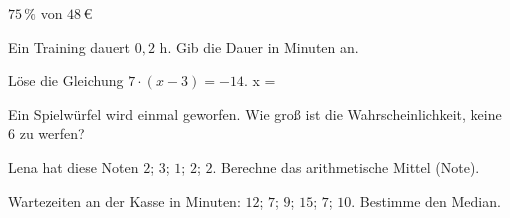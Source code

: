 \documentclass[11pt]{article}
\begin{document}
\noindent\begin{minipage}[t]{0.485\linewidth}\raggedright
\begin{aufgabe}{$75\,\%$ von $48\,€$ \leerfeld[€]}
\end{aufgabe}
\end{minipage}\hfill\begin{minipage}[t]{0.485\linewidth}\raggedright
\begin{aufgabe}{Ein Training dauert $0{,}2$ h. Gib die Dauer in Minuten an. \leerfeld[min]}
\end{aufgabe}
\end{minipage}\par

\noindent\begin{minipage}[t]{0.485\linewidth}\raggedright
\begin{aufgabe}{Löse die Gleichung $7 \cdot (x - 3) = -14$. x = \leerfeld}
\end{aufgabe}
\end{minipage}\hfill\begin{minipage}[t]{0.485\linewidth}\raggedright
\begin{aufgabe}{Ein Spielwürfel wird einmal geworfen. Wie groß ist die Wahrscheinlichkeit, keine 6 zu werfen? \leerfeld}
\end{aufgabe}
\end{minipage}\par

\noindent\begin{minipage}[t]{0.485\linewidth}\raggedright
\begin{aufgabe}{Lena hat diese Noten $2$; $3$; $1$; $2$; $2$. Berechne das arithmetische Mittel (Note). \leerfeld}
\end{aufgabe}
\end{minipage}\hfill\begin{minipage}[t]{0.485\linewidth}\raggedright
\begin{aufgabe}{Wartezeiten an der Kasse in Minuten: $12$; $7$; $9$; $15$; $7$; $10$. Bestimme den Median. \leerfeld[min]}
\end{aufgabe}
\end{minipage}\par
\end{document}
